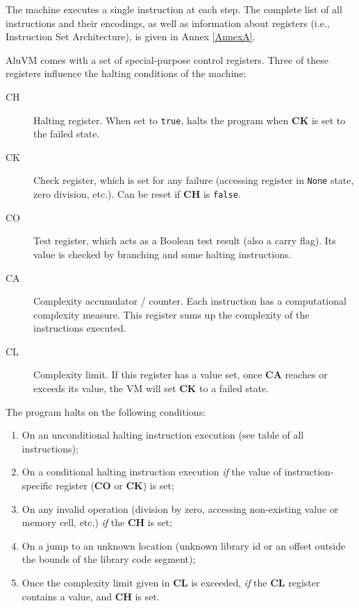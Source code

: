 \documentclass[9pt,oneside]{amsart}
\begin{document}
\begin{multicols}{2}
The machine executes a single instruction at each step.
The complete list of all instructions and their encodings,
as well as information about registers (i.e., Instruction Set Architecture),
is given in Annex \ref{AnnexA}.

AluVM comes with a set of special-purpose control registers.
Three of these registers influence the halting conditions of the machine:

\begin{description}
\item[CH] Halting register. When set to \texttt{true}, halts the program when \textbf{CK} is set to the failed state.
\item[CK] Check register, which is set for any failure (accessing register in \texttt{None} state,
        zero division, etc.). Can be reset if \textbf{CH} is \texttt{false}.
\item[CO] Test register, which acts as a Boolean test result (also a carry flag).
        Its value is checked by branching and some halting instructions.
\item[CA] Complexity accumulator / counter.
        Each instruction has a computational complexity measure.
        This register sums up the complexity of the instructions executed.
\item[CL] Complexity limit. If this register has a value set, once \textbf{CA} reaches or exceeds its value,
        the VM will set \textbf{CK} to a failed state.
\end{description}

The program halts on the following conditions:

\begin{enumerate}
\item On an unconditional halting instruction execution (see table of all instructions);
\item On a conditional halting instruction execution
   \emph{if} the value of instruction-specific register (\textbf{CO} or \textbf{CK}) is set;
\item On any invalid operation (division by zero, accessing non-existing value or memory cell, etc.)
   \emph{if} the \textbf{CH} is set;
\item On a jump to an unknown location
   (unknown library id or an offset outside the bounds of the library code segment);
\item Once the complexity limit given in \textbf{CL} is exceeded,
   \emph{if} the \textbf{CL} register contains a value, and \textbf{CH} is set.
\end{enumerate}


\end{multicols}
\end{document}
